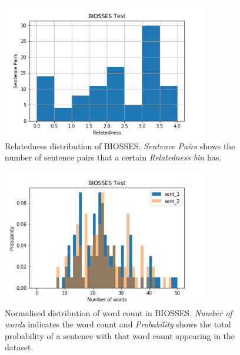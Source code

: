 \begin{enumerate}
\begin{figure}
	\centering
	\includegraphics[width=0.8\textwidth]{figures/semantic_textual_similarity/introduction/biosses.png}
	\caption[Relatedness distribution of BIOSSES]{Relatedness distribution of BIOSSES. \textit{Sentence Pairs} shows the number of sentence pairs that a certain \textit{Relatedness bin} has.}
	\label{fig:biosses_relatedness}
\end{figure}

\begin{figure}
	\centering
	\includegraphics[width=0.8\textwidth]{figures/semantic_textual_similarity/introduction/biosses_words.png}
	\caption[Normalised distribution of word count in BIOSSES.]{Normalised distribution of word count in BIOSSES. \textit{Number of words} indicates the word count and \textit{Probability} shows the total probability of a sentence with that word count appearing in the dataset.}
	\label{fig:biosses_words}
\end{figure}



\end{enumerate}
